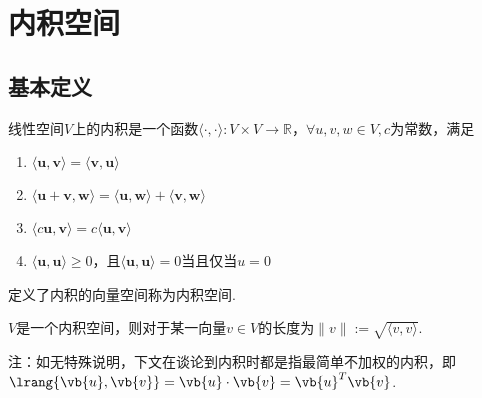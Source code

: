 
\section{内积空间}
\subsection{基本定义}
\begin{definition}[内积空间]
线性空间$V$上的内积是一个函数$\langle\cdot,\cdot\rangle:V\times V\to\mathbb{R}$，$\forall u,v,w\in V,c$为常数，满足
\begin{enumerate}
	\itemsep -3pt
	\item $\langle \mathbf{u},\mathbf{v} \rangle=\langle \mathbf{v},\mathbf{u} \rangle$
	\item $\langle \mathbf{u}+\mathbf{v},\mathbf{w} \rangle=\langle \mathbf{u},\mathbf{w} \rangle+\langle \mathbf{v},\mathbf{w} \rangle$
	\item $\langle c\mathbf{u},\mathbf{v} \rangle=c\langle \mathbf{u},\mathbf{v} \rangle$
	\item $\langle \mathbf{u},\mathbf{u} \rangle\geq 0$，且$\langle \mathbf{u},\mathbf{u} \rangle=0$当且仅当$u=0$
\end{enumerate}
定义了内积的向量空间称为内积空间.
\end{definition}
\begin{definition}[长度/模/范数]
$V$是一个内积空间，则对于某一向量$v\in V$的长度为$\|v\|:=\sqrt{\langle v,v\rangle}$.
\end{definition}
注：如无特殊说明，下文在谈论到内积时都是指最简单不加权的内积，即$\lrang{\vb{u},\vb{v}}=\vb{u}\cdot\vb{v}=\vb{u}^T\vb{v}$.

